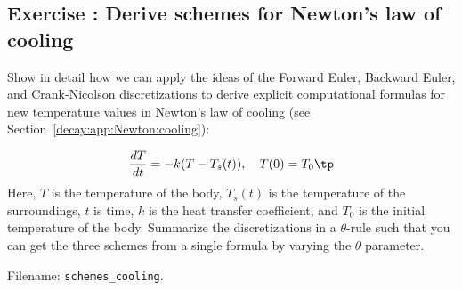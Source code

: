 \documentclass[graybox,sectrefs,envcountresetchap,open=right,final]{svmonodo}
\newenvironment{doconceexercise}{}{}
\newcounter{doconceexercisecounter}
\begin{document}
\begin{doconceexercise}

\subsection*{Exercise \thedoconceexercisecounter: Derive schemes for Newton's law of cooling}

\label{decay:app:exer:cooling:schemes}

Show in detail how we can apply the ideas of the Forward Euler,
Backward Euler, and Crank-Nicolson
discretizations to derive explicit
computational formulas for new temperature values in Newton's law of
cooling (see Section~\ref{decay:app:Newton:cooling}):

\[
\frac{dT}{dt} = -k(T-T_s(t)),\quad T(0)=T_0\tp
\]
Here, $T$ is the temperature of the body, $T_s(t)$ is the temperature
of the surroundings, $t$ is time, $k$ is the heat transfer
coefficient, and $T_0$ is the initial temperature of the body.
Summarize the discretizations in a $\theta$-rule
such that you can get the three
schemes from a single formula by varying the $\theta$ parameter.


\noindent Filename: \Verb!schemes_cooling!.

\end{doconceexercise}
\end{document}
